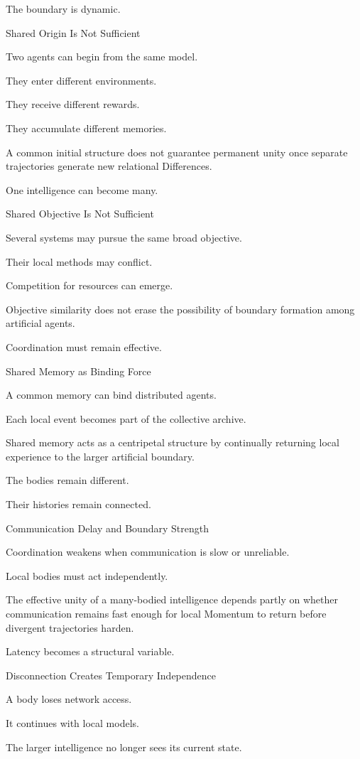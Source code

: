 The boundary is dynamic.

Shared Origin Is Not Sufficient

Two agents can begin from the same model.

They enter different environments.

They receive different rewards.

They accumulate different memories.

A common initial structure does not guarantee permanent unity once separate trajectories generate new relational Differences.

One intelligence can become many.

Shared Objective Is Not Sufficient

Several systems may pursue the same broad objective.

Their local methods may conflict.

Competition for resources can emerge.

Objective similarity does not erase the possibility of boundary formation among artificial agents.

Coordination must remain effective.

Shared Memory as Binding Force

A common memory can bind distributed agents.

Each local event becomes part of the collective archive.

Shared memory acts as a centripetal structure by continually returning local experience to the larger artificial boundary.

The bodies remain different.

Their histories remain connected.

Communication Delay and Boundary Strength

Coordination weakens when communication is slow or unreliable.

Local bodies must act independently.

The effective unity of a many-bodied intelligence depends partly on whether communication remains fast enough for local Momentum to return before divergent trajectories harden.

Latency becomes a structural variable.

Disconnection Creates Temporary Independence

A body loses network access.

It continues with local models.

The larger intelligence no longer sees its current state.

